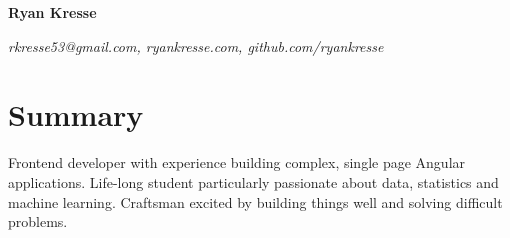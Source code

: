 \documentclass[10pt]{article}
\begin{document}
	\begin{flushleft}
		\textbf{{\Huge Ryan Kresse}}
	\end{flushleft}
	\emph{rkresse53@gmail.com, ryankresse.com, github.com/ryankresse}
	
	\begin{comment}
		\renewcommand{\abstractname}{Summary}
	
		\begin{abstract}
			Frontend developer with experience building complex, single page Angular applications. Life-long student particularly passionate about data, statistics and machine learning. Craftsman excited by building things well and solving difficult
		problems.
		\end{abstract}
	\end{comment}
	\section{Summary}
		Frontend developer with experience building complex, single page Angular applications. Life-long student particularly passionate about data, statistics and machine learning. Craftsman excited by building things well and solving difficult
		problems.
	\begin{comment}
	\section{Contact and Links}
		\begin{itemize}[noitemsep]
			\item rkresse53@gmail.com
			\item ryankresse.com
			\item github.com/ryankresse
		\end{itemize}
	\end{comment}
	
\end{document}
